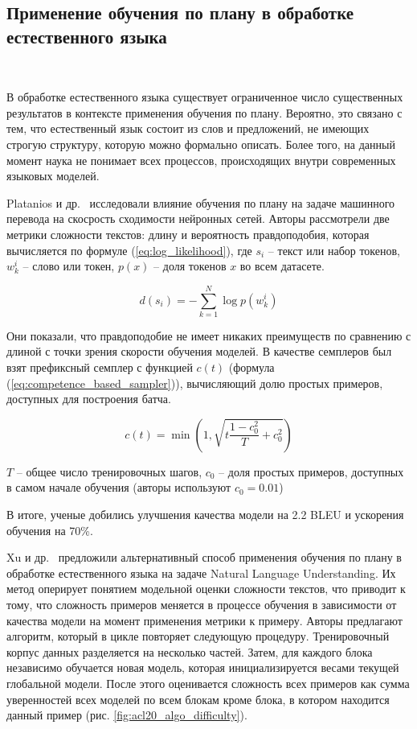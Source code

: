 \documentclass{spbau-diploma}
\begin{document}
\subsection{Применение обучения по плану в обработке естественного языка}
\ 

В обработке естественного языка существует ограниченное число существенных результатов в контексте применения обучения по плану. Вероятно, это связано с тем, что естественный язык состоит из слов и предложений, не имеющих строгую структуру, которую можно формально описать. Более того, на данный момент наука не понимает всех процессов, происходящих внутри современных языковых моделей.

Platanios и др.~\cite{platanios2019competence} исследовали влияние обучения по плану на задаче машинного перевода на скосрость сходимости нейронных сетей. Авторы рассмотрели две метрики сложности текстов: длину и вероятность правдоподобия, которая вычисляется по формуле (\ref{eq:log_likelihood}), где $s_i$ -- текст или набор токенов, $w_k^i$ -- слово или токен, $p(x)$ -- доля токенов $x$ во всем датасете.

\begin{equation} \label{eq:log_likelihood}
d(s_i) = -\sum\limits_{k=1}^{N}\log p(w_k^i)
\end{equation}

Они показали, что правдоподобие не имеет никаких преимуществ по сравнению  с длиной с точки зрения скорости обучения моделей. В качестве семплеров был взят префиксный семплер с функцией $c(t)$ (формула (\ref{eq:competence_based_sampler})), вычисляющий долю простых примеров, доступных для построения батча.

\begin{equation} \label{eq:competence_based_sampler}
c(t) = \min\left(1, \sqrt{t\frac{1 - c_0^2}{T} + c_0^2}\right)
\end{equation}

$T$ -- общее число тренировочных шагов, $c_0$ -- доля простых примеров, доступных в самом начале обучения (авторы используют $c_0 = 0.01$)

В итоге, ученые добились улучшения качества модели на 2.2 BLEU и ускорения обучения на 70\%.

Xu и др.~\cite{xu2020curriculum} предложили альтернативный способ применения обучения по плану в обработке естественного языка на задаче Natural Language Understanding. Их метод оперирует понятием модельной оценки сложности текстов, что приводит к тому, что сложность примеров меняется в процессе обучения в зависимости от качества модели на момент применения метрики к примеру. Авторы предлагают алгоритм, который в цикле повторяет следующую процедуру. Тренировочный корпус данных разделяется на несколько частей. Затем, для каждого блока независимо обучается новая модель, которая инициализируется весами текущей глобальной модели. После этого оценивается сложность всех примеров как сумма уверенностей всех моделей по всем блокам кроме блока, в котором находится данный пример (рис. \ref{fig:acl20_algo_difficulty}).
\end{document}
